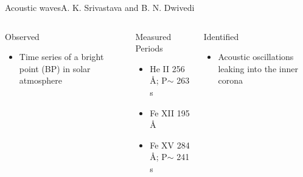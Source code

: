 \documentclass[11pt,table]{beamer}
\begin{document}
\begin{frame}[t]{Acoustic waves}{A. K. Srivastava and B. N. Dwivedi}
    \begin{columns}
        \begin{block}{Observed}
            \begin{itemize}
                \item Time series of a bright point (BP) in solar atmosphere
            \end{itemize}
        \end{block}
        \begin{block}{Measured Periods}
            \begin{itemize}
                \item He {\footnotesize II} 256 \AA{}; P$\sim$ 263 s
                \item Fe {\footnotesize XII} 195 \AA{}\\
                \item Fe {\footnotesize XV} 284 \AA{}; P$\sim$ 241 s
            \end{itemize}
        \end{block}
        \begin{block}{Identified}
            \begin{itemize}
                \item Acoustic oscillations leaking into the inner corona

\end{itemize}
\end{block}
\end{columns}
\end{frame}
\end{document}
